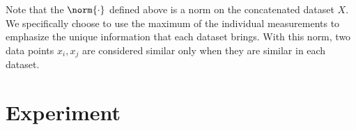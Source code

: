 \documentclass{article}
\begin{document}
Note that the $\norm{\cdot}$ defined above is a norm on the concatenated dataset
$X$. We specifically choose to use the maximum of the individual measurements to
emphasize the unique information that each dataset brings. With this norm, two
data points $x_i,x_j$ are considered similar only when they are similar in each
dataset.

\section{Experiment}
\label{sec:experiment}

\end{document}
